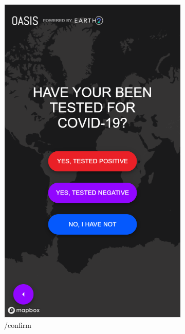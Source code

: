 \documentclass{ucsdreport}
\begin{document}
\begin{figure}[H]
\begin{subfigure}{.33\textwidth}
		\includegraphics[scale = 0.47]{images/update2.PNG}
		\caption{/confirm}
	\end{subfigure}
	\begin{subfigure}{.33\textwidth}
	    \centering

\end{subfigure}
\end{figure}
\end{document}
